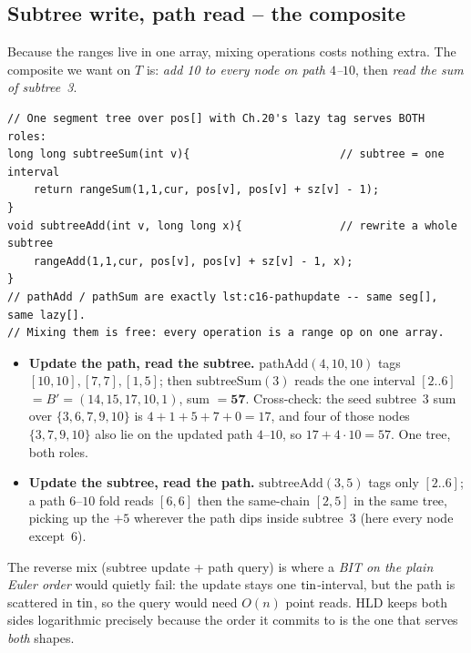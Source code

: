 \subsection{Subtree write, path read -- the composite}

Because the ranges live in one array, mixing operations costs nothing extra. The composite we want on \(T\) is: \emph{add 10 to every node on path \(4\)--\(10\)}, then \emph{read the sum of subtree~3}.

\begin{lstlisting}[caption={Subtree operations in the HLD order: range add / range sum over [pos(v), pos(v)+size(v)-1] on the SAME lazy tree that serves the path loop of lst:c16-pathupdate}, label={lst:c16-subpath}]
// One segment tree over pos[] with Ch.20's lazy tag serves BOTH roles:
long long subtreeSum(int v){                       // subtree = one interval
    return rangeSum(1,1,cur, pos[v], pos[v] + sz[v] - 1);
}
void subtreeAdd(int v, long long x){               // rewrite a whole subtree
    rangeAdd(1,1,cur, pos[v], pos[v] + sz[v] - 1, x);
}
// pathAdd / pathSum are exactly lst:c16-pathupdate -- same seg[], same lazy[].
// Mixing them is free: every operation is a range op on one array.
\end{lstlisting}

\begin{itemize}[nosep,leftmargin=1.4em]
  \item \textbf{Update the path, read the subtree.} \(\text{pathAdd}(4,10,10)\) tags \([10,10],[7,7],[1,5]\); then \(\text{subtreeSum}(3)\) reads the one interval \([2..6]\) \(=B'=(14,15,17,10,1)\), sum \(=\mathbf{57}\). Cross-check: the seed subtree~3 sum over \(\{3,6,7,9,10\}\) is \(4{+}1{+}5{+}7{+}0=17\), and four of those nodes \(\{3,7,9,10\}\) also lie on the updated path \(4\)--\(10\), so \(17+4\cdot10=57\). One tree, both roles.
  \item \textbf{Update the subtree, read the path.} \(\text{subtreeAdd}(3,5)\) tags only \([2..6]\); a path \(6\)--\(10\) fold reads \([6,6]\) then the same-chain \([2,5]\) in the same tree, picking up the \(+5\) wherever the path dips inside subtree~3 (here every node except~6).
\end{itemize}

\begin{observation}
The reverse mix (subtree update + path query) is where a \emph{BIT on the plain Euler order} would quietly fail: the update stays one \(\operatorname{tin}\)-interval, but the path is scattered in \(\operatorname{tin}\), so the query would need \(O(n)\) point reads. HLD keeps both sides logarithmic precisely because the order it commits to is the one that serves \emph{both} shapes.
\end{observation}

